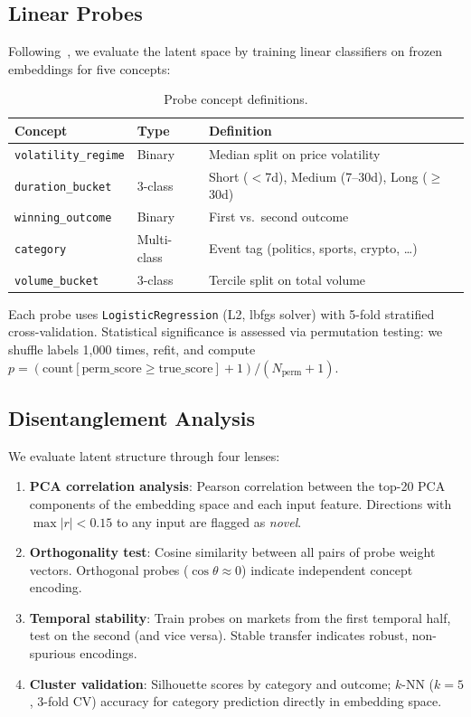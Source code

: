 \documentclass[11pt,a4paper]{article}
\begin{document}
\subsection{Linear Probes}

Following~\cite{alain2017understanding}, we evaluate the latent space by training linear classifiers on frozen embeddings for five concepts:

\begin{table}[H]
\centering
\caption{Probe concept definitions.}
\label{tab:probes}
\begin{tabular}{@{}lll@{}}
\toprule
\textbf{Concept} & \textbf{Type} & \textbf{Definition} \\
\midrule
\texttt{volatility\_regime} & Binary & Median split on price volatility \\
\texttt{duration\_bucket} & 3-class & Short ($<$7d), Medium (7--30d), Long ($\geq$30d) \\
\texttt{winning\_outcome} & Binary & First vs.\ second outcome \\
\texttt{category} & Multi-class & Event tag (politics, sports, crypto, \ldots) \\
\texttt{volume\_bucket} & 3-class & Tercile split on total volume \\
\bottomrule
\end{tabular}
\end{table}

Each probe uses \texttt{LogisticRegression} (L2, lbfgs solver) with 5-fold stratified cross-validation. Statistical significance is assessed via permutation testing: we shuffle labels 1,000 times, refit, and compute $p = (\text{count}[\text{perm\_score} \geq \text{true\_score}] + 1) / (N_{\text{perm}} + 1)$.

\subsection{Disentanglement Analysis}

We evaluate latent structure through four lenses:

\begin{enumerate}[nosep]
    \item \textbf{PCA correlation analysis}: Pearson correlation between the top-20 PCA components of the embedding space and each input feature. Directions with $\max|r| < 0.15$ to any input are flagged as \emph{novel}.
    \item \textbf{Orthogonality test}: Cosine similarity between all pairs of probe weight vectors. Orthogonal probes ($\cos \theta \approx 0$) indicate independent concept encoding.
    \item \textbf{Temporal stability}: Train probes on markets from the first temporal half, test on the second (and vice versa). Stable transfer indicates robust, non-spurious encodings.
    \item \textbf{Cluster validation}: Silhouette scores by category and outcome; $k$-NN ($k=5$, 3-fold CV) accuracy for category prediction directly in embedding space.
\end{enumerate}
\end{document}
